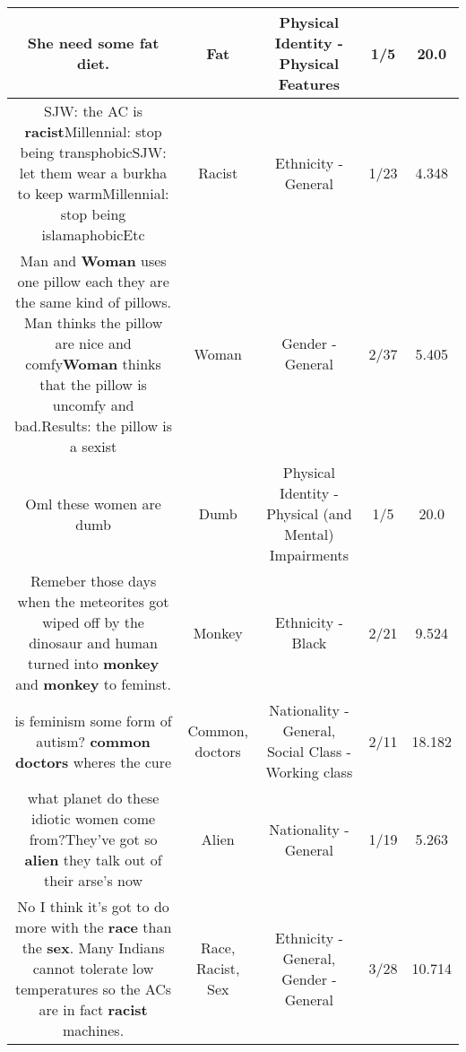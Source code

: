 \documentclass[11pt]{article}
\newlength\mylength
\begin{document}
\begin{center}
\begin{longtable}{|C{.65\mylength}|C{.30\mylength}|C{.12\mylength}|C{.12\mylength}|C{.12\mylength}|}
  \small She need some \textbf{fat} diet.\normalsize   & Fat & Physical Identity - Physical Features & 1/5 & 20.0 \\  \hline
  \small SJW: the AC is \textbf{racist}Millennial: stop being transphobicSJW: let them wear a burkha to keep warmMillennial: stop being islamaphobicEtc\normalsize   & Racist & Ethnicity - General & 1/23 & 4.348 \\  \hline
  \small Man and \textbf{Woman} uses one pillow each they are the same kind of pillows. Man thinks the pillow are nice and comfy\textbf{Woman} thinks that the pillow is uncomfy and bad.Results: the pillow is a sexist\normalsize   & Woman & Gender - General & 2/37 & 5.405 \\  \hline
  \small Oml these women are dumb\normalsize   & Dumb & Physical Identity - Physical (and Mental) Impairments & 1/5 & 20.0 \\  \hline
  \small Remeber those days when the meteorites got wiped off by the dinosaur and human turned into \textbf{monkey} and \textbf{monkey} to feminst.\normalsize   & Monkey & Ethnicity - Black & 2/21 & 9.524 \\  \hline
  \small is feminism some form of autism? \textbf{common} \textbf{doctors} wheres the cure\normalsize   & Common, doctors & Nationality - General, Social Class - Working class & 2/11 & 18.182 \\  \hline
  \small what planet do these idiotic women come from?They've got so \textbf{alien} they talk out of their arse's now\normalsize   & Alien & Nationality - General & 1/19 & 5.263 \\  \hline
  \small No I think it's got to do more with the \textbf{race} than the \textbf{sex}. Many Indians cannot tolerate low temperatures so the ACs are in fact \textbf{racist} machines.\normalsize   & Race, Racist, Sex & Ethnicity - General, Gender - General & 3/28 & 10.714 \\  \hline

\end{longtable}
\end{center}
\end{document}

